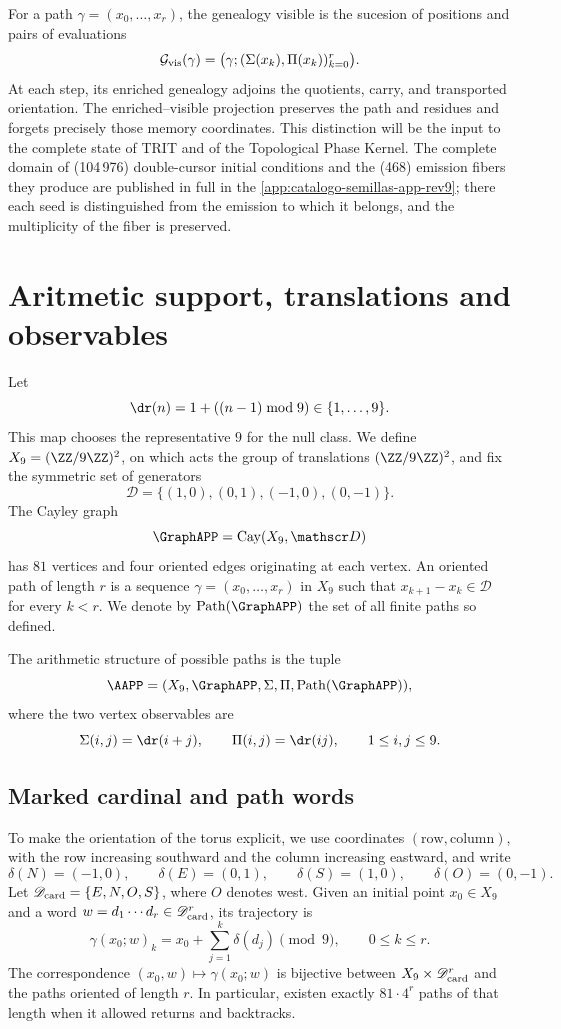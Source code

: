 For a path \(\gamma=(x_0,\ldots,x_r)\), the genealogy visible is the
sucesion of positions and pairs of evaluations
\[
 \mathcal G_{\rm vis}(\gamma)
 =\bigl(\gamma;(\Sigma(x_k),\Pi(x_k))_{k=0}^{r}\bigr).
\]
At each step, its enriched genealogy adjoins the quotients, carry, and
transported orientation. The enriched--visible projection preserves the
path and residues and forgets precisely those memory coordinates. This
distinction will be the input to the complete state of TRIT and of the Topological Phase Kernel.
The complete domain of (104\,976) double-cursor initial conditions and
the (468) emission fibers they produce are published in full in the
\cref{app:catalogo-semillas-app-rev9}; there each seed is distinguished from the
emission to which it belongs, and the multiplicity of the fiber is preserved.

\section{Aritmetic support, translations and observables}

Let
\[
\dr(n)=1+((n-1)\bmod9)\in\{1,\ldots,9\}.
\]
This map chooses the representative \(9\) for the null class. We define
\(X_9=(\ZZ/9\ZZ)^2\), on which acts the group of translations
\((\ZZ/9\ZZ)^2\), and fix the symmetric set of generators
\[
 \mathscr D=\{(1,0),(0,1),(-1,0),(0,-1)\}.
\]
The Cayley graph
\[
 \GraphAPP=\operatorname{Cay}(X_9,\mathscr D)
\]
has \(81\) vertices and four oriented edges originating at each vertex.
An oriented path of length \(r\) is a sequence
\(\gamma=(x_0,\ldots,x_r)\) in \(X_9\) such that
\(x_{k+1}-x_k\in\mathscr D\) for every \(k<r\). We denote by
\(\operatorname{Path}(\GraphAPP)\) the set of all finite paths
so defined.

\begin{definition}
The arithmetic structure of possible paths is the tuple
\[
 \AAPP=(X_9,\GraphAPP,\Sigma,\Pi,
        \operatorname{Path}(\GraphAPP)),
\]
where the two vertex observables are
\[
\Sigma(i,j)=\dr(i+j),
\qquad
\Pi(i,j)=\dr(ij),
\qquad1\le i,j\le9.
\]
\end{definition}

\subsection*{Marked cardinal and path words}

To make the orientation of the torus explicit, we use coordinates
\((\text{row},\text{column})\), with the row increasing southward and the
column increasing eastward, and write
\[
 \delta(N)=(-1,0),\qquad \delta(E)=(0,1),\qquad
 \delta(S)=(1,0),\qquad \delta(O)=(0,-1).
\]
Let \(\mathscr D_{\rm card}=\{E,N,O,S\}\), where \(O\) denotes west. Given an initial point
\(x_0\in X_9\) and a word \(w=d_1\cdots d_r\in
\mathscr D_{\rm card}^{r}\), its trajectory is
\[
 \gamma(x_0;w)_k
 =x_0+\sum_{j=1}^{k}\delta(d_j)\pmod 9,
 \qquad 0\leq k\leq r.
\]
The correspondence \((x_0,w)\mapsto\gamma(x_0;w)\) is bijective between
\(X_9\times\mathscr D_{\rm card}^{r}\) and the paths oriented of
length \(r\). In particular, existen exactly \(81\cdot4^r\) paths
of that length when it allowed returns and backtracks.

